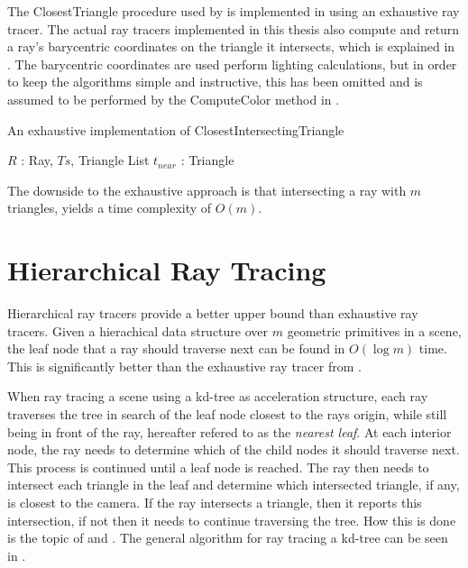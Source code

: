 

The ClosestTriangle procedure used by  is
implemented in  using an exhaustive ray tracer. The
actual ray tracers implemented in this thesis also compute and return a ray's
barycentric coordinates on the triangle it intersects, which is explained in
. The barycentric coordinates are used perform
lighting calculations, but in order to keep the algorithms simple and
instructive, this has been omitted and is assumed to be performed by the
ComputeColor method in .


\begin{algorithm}
  \caption{An exhaustive implementation of ClosestIntersectingTriangle}
  \label{alg:exhaustive}
  \begin{algorithmic}
              {$R$ : Ray, $Ts$, Triangle List}
              {$t_{near}$ : Triangle}{
                \ENDFOR
              }
  \end{algorithmic}
\end{algorithm}

The downside to the exhaustive approach is that intersecting a ray with $m$
triangles, yields a time complexity of $O(m)$.

\section{Hierarchical Ray Tracing}\label{sec:hierarchicalTraversal}


Hierarchical ray tracers provide a better upper bound than exhaustive ray
tracers. Given a hierachical data structure over $m$ geometric primitives in a
scene, the leaf node that a ray should traverse next can be found in $O(\log m)$
time. This is significantly better than the exhaustive ray tracer from
.


When ray tracing a scene using a kd-tree as acceleration structure, each ray
traverses the tree in search of the leaf node closest to the rays origin, while
still being in front of the ray, hereafter refered to as the \textit{nearest
  leaf}. At each interior node, the ray needs to determine which of the child
nodes it should traverse next. This process is continued until a leaf node is
reached. The ray then needs to intersect each triangle in the leaf and determine
which intersected triangle, if any, is closest to the camera. If the ray
intersects a triangle, then it reports this intersection, if not then it needs
to continue traversing the tree. How this is done is the topic of
 and . The general
algorithm for ray tracing a kd-tree can be seen in .

